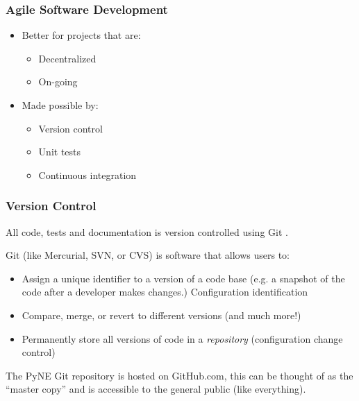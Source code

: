 \documentclass[12pt]{beamer}
\begin{document}
\begin{frame}
\frametitle{Agile Software Development}

\begin{itemize}
\item{Better for projects that are:}
    \begin{itemize}
    \item{Decentralized}
    \item{On-going}
    \end{itemize}
\item{Made possible by:}
    \begin{itemize}
    \item{Version control}
    \item{Unit tests}
    \item{Continuous integration}
    \end{itemize}
\end{itemize}

\end{frame}


\begin{frame}
\frametitle{Version Control}

All code, tests and documentation is version controlled using Git \cite{git}.

Git (like Mercurial, SVN, or CVS) is software that allows users to:
\begin{itemize}
\item{Assign a unique identifier to a version of a code base (e.g. a snapshot of 
      the code after a developer makes changes.) \alert{Configuration identification}}
\item{Compare, merge, or revert to different versions (and much more!)}
\item{Permanently store all versions of code in a \emph{repository} (\alert{configuration change control})}
\end{itemize}

The PyNE Git repository is hosted on GitHub.com, this can be thought of as the
``master copy'' and is accessible to the general public (like everything). 

\end{frame}
\end{document}
